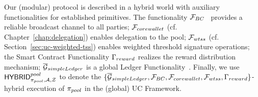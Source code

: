 Our (modular) protocol is described in a hybrid world with auxiliary
functionalities for established primitives. The functionality
${\mathcal{F}}_{BC}$~\cite{EC:HirZik10} provides a reliable broadcast channel to all parties;
${\mathcal{F}}_{corewallet}$ (cf. Chapter~\ref{chap:delegation}) enables delegation to the pool;
${\mathcal{F}}_{wtss}$ (cf. Section~\ref{sec:uc-weighted-tss}) enables weighted threshold
signature operations; the Smart Contract Functionality $\Gamma_{reward}$ realizes
the reward distribution mechanism; ${\overline{\mathcal{G}}}_{simpleLedger}$ is a global Ledger
Functionality~\cite{kachina}. Finally, we use ${\mathsf{HYBRID}^{pool}_{\pi_{pool}, \mathcal{A}, \mathcal{Z}}}$ to denote the $\{
    {\overline{\mathcal{G}}}_{simpleLedger}, {\mathcal{F}}_{BC}, {\mathcal{F}}_{corewallet}, {\mathcal{F}}_{wtss}, \Gamma_{reward} \}$-hybrid execution of
$\pi_{pool}$ in the (global) UC Framework.

